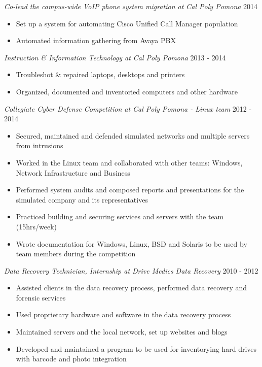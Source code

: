 \documentclass[line]{tex/res}
\begin{document}
\begin{resume}
	{\sl Co-lead the campus-wide VoIP phone system migration at Cal Poly Pomona} \hfill 2014
	\begin{itemize} \itemsep -2pt
		\item Set up a system for automating Cisco Unified Call Manager population
		\item Automated information gathering from Avaya PBX
	\end{itemize}

	{\sl Instruction \& Information Technology at Cal Poly Pomona} \hfill 2013 - 2014
	\begin{itemize} \itemsep -2pt
		\item Troubleshot \& repaired laptops, desktops and printers
		\item Organized, documented and inventoried computers and other hardware
	\end{itemize}

    {\sl Collegiate Cyber Defense Competition at Cal Poly Pomona - Linux team} \hfill 2012 - 2014
	\begin{itemize} \itemsep -2pt
		\item Secured, maintained and defended simulated networks and multiple servers from intrusions
		\item Worked in the Linux team and collaborated with other teams: Windows, Network Infrastructure and Business
		\item Performed system audits and composed reports and presentations for the simulated company and its representatives
		\item Practiced building and securing services and servers with the team (15hrs/week)
		\item Wrote documentation for Windows, Linux, BSD and Solaris to be used by team members during the competition
	\end{itemize}

	{\sl Data Recovery Technician, Internship at Drive Medics Data Recovery} \hfill 2010 - 2012
	\begin{itemize} \itemsep -2pt
		\item Assisted clients in the data recovery process, performed data recovery and forensic services
		\item Used proprietary hardware and software in the data recovery process
		\item Maintained servers and the local network, set up websites and blogs
		\item Developed and maintained a program to be used for inventorying hard drives with barcode and photo integration
	\end{itemize}


\end{resume}
\end{document}
